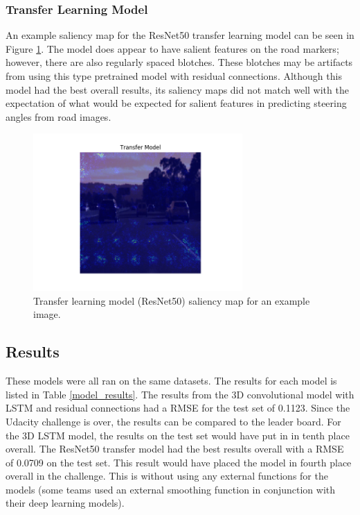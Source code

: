 \documentclass[10pt,twocolumn,letterpaper]{article}
\begin{document}
\subsubsection{Transfer Learning Model}

An example saliency map for the ResNet50 transfer learning model can be seen in Figure \ref{resnet50_saliency}. The model does appear to have salient features on the road markers; however, there are also regularly spaced blotches. These blotches may be artifacts from using this type pretrained model with residual connections. Although this model had the best overall results, its saliency maps did not match well with the expectation of what would be expected for salient features in predicting steering angles from road images. 

\begin{figure}[!htb]
	\includegraphics[width=8cm]{resnet50trans_saliency.png}
	\centering
	\caption{Transfer learning model (ResNet50) saliency map for an example image.}
	\label{resnet50_saliency}
\end{figure}


\subsection{Results}
These models were all ran on the same datasets. The results for each model is listed in Table \ref{model_results}. The results from the 3D convolutional model with LSTM and residual connections had a RMSE for the test set of 0.1123. Since the Udacity challenge is over, the results can be compared to the leader board. For the 3D LSTM model, the results on the test set would have put in in tenth place overall. The ResNet50 transfer model had the best results overall with a RMSE of 0.0709 on the test set. This result would have placed the model in fourth place overall in the challenge. This is without using any external functions for the models (some teams used an external smoothing function in conjunction with their deep learning models).
\end{document}
